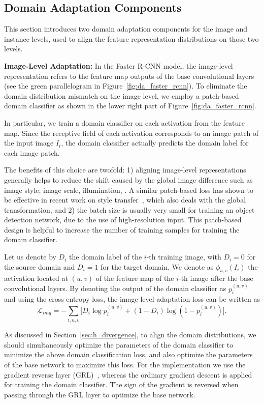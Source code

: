 \documentclass[10pt,twocolumn,letterpaper]{article}
\def\cL{\mathcal{L}}
\begin{document}
\subsection{Domain Adaptation Components}
\label{sec:da_faster_rcnn}
This section introduces two domain adaptation components for the image and instance levels, used to align the feature representation distributions on those two levels. 

\textbf{Image-Level Adaptation: } In the Faster R-CNN model, the image-level representation refers to the feature map outputs of the base convolutional layers (see the green parallelogram in Figure~\ref{fig:da_faster_rcnn}). To eliminate the domain distribution mismatch on the image level, we employ a patch-based domain classifier as shown in the lower right part of Figure~\ref{fig:da_faster_rcnn}. 

In particular, we train a domain classifier on each activation from the feature map.  Since the receptive field of each activation corresponds to an image patch of the input image $I_i$, the domain classifier actually predicts the domain label for each image patch.

The benefits of this choice are twofold: 1)  aligning image-level representations generally helps to reduce the shift caused by the global image difference such as image style, image scale, illumination, \etc. 
A similar patch-based loss has shown to be effective in recent work on style transfer~\cite{johnson2016perceptual}, which also deals with the global transformation, and 2) the batch size is usually very small for training an object detection network, due to the use of high-resolution input. This patch-based design is helpful to increase the number of training samples for training the domain classifier. 

Let us denote by $D_i$ the domain label of the $i$-th training image, with $D_i=0$ for the source domain and $D_i=1$ for the target domain. We denote as $\phi_{u,v}(I_i)$ the activation located at $(u,v)$ of the feature map of the $i$-th image after the base convolutional layers. By denoting the output of the domain classifier as $p_{i}^{(u,v)}$ and using the cross entropy loss, the image-level adaptation loss can be written as
\begin{equation}
\cL_{img} = -\sum_{i,u,v}\Big[D_i\log p_{i}^{(u,v)} + (1-D_i)\log(1- p_{i}^{(u,v)})\Big].
\end{equation}

As discussed in Section~\ref{sec:h_divergence}, to align the domain distributions, we should simultaneously optimize the parameters of the domain classifier to minimize the above domain classification loss, and also optimize the parameters of the base network to maximize this loss. For the implementation we use the gradient reverse layer (GRL)~\cite{ganin2015unsupervised}, whereas the ordinary gradient descent is applied for training the domain classifier. The sign of the gradient is reversed when passing through the GRL layer to optimize the base network. 
\end{document}
